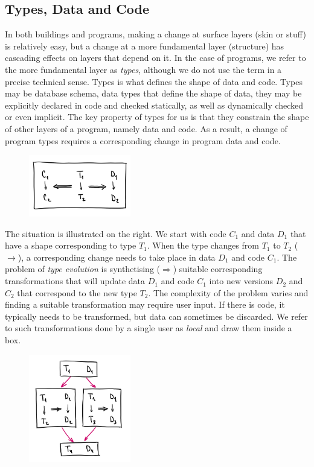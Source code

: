 \documentclass[english,submission]{programming}
\begin{document}
\subsection{Types, Data and Code}
In both buildings and programs, making a change at surface layers (skin or stuff) is relatively easy,
but a change at a more fundamental layer (structure) has cascading effects on layers that depend on it.
In the case of programs, we refer to the more fundamental layer as \emph{types}, although we do not
use the term in a precise technical sense. Types is what defines the shape of data and code.
Types may be database schema, data types that define the shape of data, they may be explicitly
declared in code and checked statically, as well as dynamically checked or even implicit.
The key property of types for us is that they constrain the shape of other layers
of a program, namely data and code. As a result, a change of program types requires a
corresponding change in program data and code.

\begin{figure}
\vspace{-1.5em}
\includegraphics[width=12em]{figures/arr-basic.png}
\vspace{-1.5em}
\end{figure}

The situation is illustrated on the right. We start with code $C_1$ and
data $D_1$ that have a shape corresponding to type $T_1$. When the type changes from $T_1$ to $T_2$ ($\rightarrow$),
a corresponding change needs to take place in data $D_1$ and code $C_1$. The problem
of \emph{type evolution} is synthetising ($\Rightarrow$) suitable corresponding transformations
that will update data $D_1$ and code $C_1$ into new versions $D_2$ and $C_2$ that correspond
to the new type $T_2$.
%
The complexity of the problem varies and finding a suitable transformation may require user
input. If there is code, it typically needs to be transformed, but data can sometimes be
discarded. We refer to such transformations done by a single user as \emph{local} and draw
them inside a box.

\begin{figure}
\vspace{-1.5em}
\includegraphics[width=12em]{figures/arr-forkjoin.png}
\vspace{-1.5em}
\end{figure}
\end{document}
